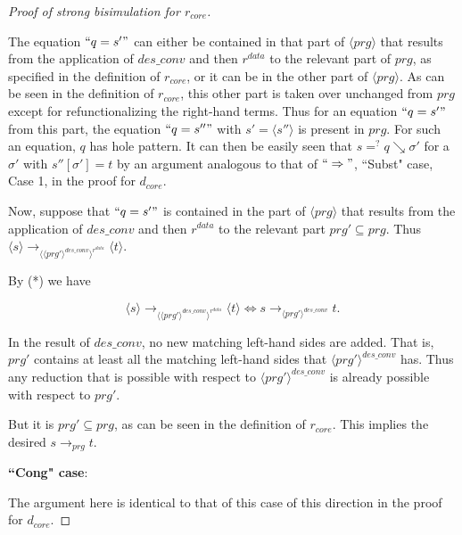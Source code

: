 \begin{proof}[Proof of strong bisimulation for $r_{core}$]
\begin{enumerate}
The equation $`` q = s' "$ can either be contained in that part of $\langle prg \rangle$ that results from the application of $des\_conv$ and then $r^{data}$ to the relevant part of $prg$, as specified in the definition of $r_{core}$, or it can be in the other part of $\langle prg \rangle$. As can be seen in the definition of $r_{core}$, this other part is taken over unchanged from $prg$ except for refunctionalizing the right-hand terms. Thus for an equation $`` q = s' "$ from this part, the equation $`` q = s'' "$ with $s' = \langle s'' \rangle$ is present in $prg$. For such an equation, $q$ has hole pattern. It can then be easily seen that $s =^? q \searrow \sigma'$ for a $\sigma'$ with $s''[\sigma'] = t$ by an argument analogous to that of $`` \Rightarrow "$, ``Subst" case, Case 1, in the proof for $d_{core}$.

Now, suppose that $`` q = s' "$ is contained in the part of $\langle prg \rangle$ that results from the application of $des\_conv$ and then $r^{data}$ to the relevant part $prg' \subseteq prg$. Thus $\langle s \rangle \longrightarrow_{\langle \langle prg' \rangle^{des\_conv} \rangle^{r^{data}}} \langle t \rangle$.

By (*) we have

\begin{equation*}
\langle s \rangle \longrightarrow_{\langle \langle prg' \rangle^{des\_conv} \rangle^{r^{data}}} \langle t \rangle \iff s \longrightarrow_{\langle prg' \rangle^{des\_conv}} t.
\end{equation*}

In the result of $des\_conv$, no new matching left-hand sides are added. That is, $prg'$ contains at least all the matching left-hand sides that $\langle prg' \rangle^{des\_conv}$ has. Thus any reduction that is possible with respect to $\langle prg' \rangle^{des\_conv}$ is already possible with respect to $prg'$.

But it is $prg' \subseteq prg$, as can be seen in the definition of $r_{core}$. This implies the desired $s \longrightarrow_{prg} t$.
\end{enumerate}

\item \textbf{``Cong" case}:

The argument here is identical to that of this case of this direction in the proof for $d_{core}$.

\end{proof}


